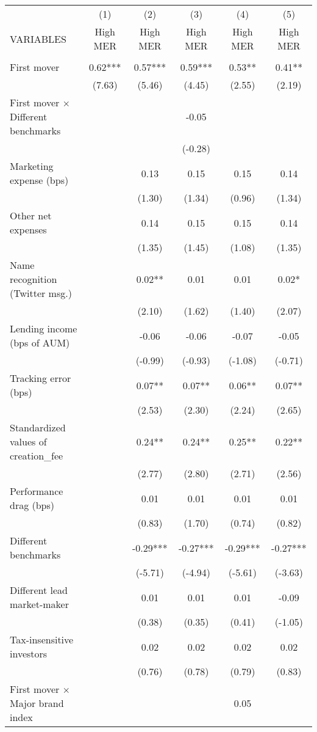 \documentclass[]{article}
\begin{document}
\begin{tabular}{lccccc} \hline
 & (1) & (2) & (3) & (4) & (5) \\
VARIABLES & High MER & High MER & High MER & High MER & High MER \\ \hline
 &  &  &  &  &  \\
First mover & 0.62*** & 0.57*** & 0.59*** & 0.53** & 0.41** \\
 & (7.63) & (5.46) & (4.45) & (2.55) & (2.19) \\
First mover $\times$ Different benchmarks &  &  & -0.05 &  &  \\
 &  &  & (-0.28) &  &  \\
Marketing expense (bps) &  & 0.13 & 0.15 & 0.15 & 0.14 \\
 &  & (1.30) & (1.34) & (0.96) & (1.34) \\
Other net expenses &  & 0.14 & 0.15 & 0.15 & 0.14 \\
 &  & (1.35) & (1.45) & (1.08) & (1.35) \\
Name recognition (Twitter msg.) &  & 0.02** & 0.01 & 0.01 & 0.02* \\
 &  & (2.10) & (1.62) & (1.40) & (2.07) \\
Lending income (bps of AUM) &  & -0.06 & -0.06 & -0.07 & -0.05 \\
 &  & (-0.99) & (-0.93) & (-1.08) & (-0.71) \\
Tracking error (bps) &  & 0.07** & 0.07** & 0.06** & 0.07** \\
 &  & (2.53) & (2.30) & (2.24) & (2.65) \\
Standardized values of creation\_fee &  & 0.24** & 0.24** & 0.25** & 0.22** \\
 &  & (2.77) & (2.80) & (2.71) & (2.56) \\
Performance drag (bps) &  & 0.01 & 0.01 & 0.01 & 0.01 \\
 &  & (0.83) & (1.70) & (0.74) & (0.82) \\
Different benchmarks &  & -0.29*** & -0.27*** & -0.29*** & -0.27*** \\
 &  & (-5.71) & (-4.94) & (-5.61) & (-3.63) \\
Different lead market-maker &  & 0.01 & 0.01 & 0.01 & -0.09 \\
 &  & (0.38) & (0.35) & (0.41) & (-1.05) \\
Tax-insensitive investors &  & 0.02 & 0.02 & 0.02 & 0.02 \\
 &  & (0.76) & (0.78) & (0.79) & (0.83) \\
First mover $\times$ Major brand index &  &  &  & 0.05 &  \\

\end{tabular}
\end{document}
